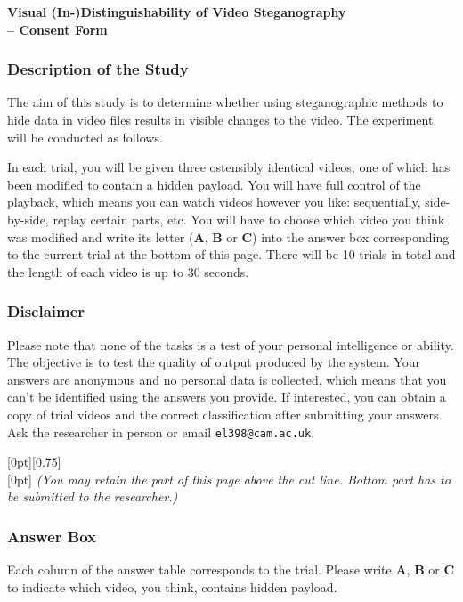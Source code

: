 \documentclass[12pt,british,usenames,dvipsnames,hypens,final]{scrartcl}
\numberwithin{equation}{section}
\numberwithin{figure}{section}
\newcommand{\textsb}[1]{\textsf{\textbf{#1}}}
\newcommand{\cuthere}{%
\noindent
\raisebox{-2.8pt}[0pt][0.75\baselineskip]{\small\ding{34}}
\unskip{\tiny\dotfill}
}
\begin{document}
{%
\Large \sffamily \textbf{Visual (In-)Distinguishability of Video Steganography \\ -- Consent Form}\smallskip
}

\subsubsection*{Description of the Study}

The aim of this study is to determine whether using steganographic methods to hide data in video files results in visible changes to the video. The experiment will be conducted as follows.

In each trial, you will be given three ostensibly identical videos, one of which has been modified to contain a hidden payload. You will have full control of the playback, which means you can watch videos however you like: sequentially, side-by-side, replay certain parts, etc. You will have to choose which video you think was modified and write its letter (\textsb{A}, \textsb{B} or \textsb{C}) into the answer box corresponding to the current trial at the bottom of this page. There will be 10 trials in total and the length of each video is up to 30 seconds. 

\subsubsection*{Disclaimer}

Please note that none of the tasks is a test of your personal intelligence or ability. The objective is to test the quality of output produced by the system. Your answers are anonymous and no personal data is collected, which means that you can't be identified using the answers you provide. If interested, you can obtain a copy of trial videos and the correct classification after submitting your answers. Ask the researcher in person or email \texttt{el398@cam.ac.uk}.

{%
\vspace{-0.2cm}
\smallskip
\cuthere\\
\medskip
\raisebox{4.5pt}[0pt]{\small \:\: \textit{(You may retain the part of this page above the cut line. Bottom part has to be submitted to the researcher.)}}
\vspace{-0.4cm}
}


\subsubsection*{Answer Box}
Each column of the answer table corresponds to the trial. Please write \textsb{A},  \textsb{B} or \textsb{C} to indicate which video, you think, contains hidden payload.
\end{document}
